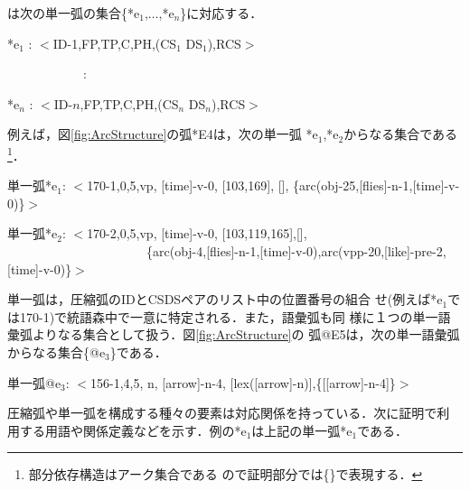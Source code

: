 {\mynoindent}は次の単一弧の集合\{*e$_1$,${\ldots}$,*e$_n$\}に対応する．

\mygapskip
*e$_1$ : $<$ID-1,FP,TP,C,PH,(CS$_1$ DS$_1$),RCS$>$

　　　　　　:

*e$_n$ : $<$ID-$n$,FP,TP,C,PH,(CS$_n$ DS$_n$),RCS$>$
\mygapskip

{\mynoindent}例えば，図\ref{fig:ArcStructure}の弧*E4は，次の単一弧
*e$_1$,*e$_2$からなる集合である\footnote{部分依存構造はアーク集合である
ので証明部分では\{\}で表現する．}．

\mygapskip
単一弧*e$_1$: $<$170-1,0,5,vp, [time]-v-0, [103,169], [], \{arc(obj-25,[flies]-n-1,[time]-v-0)\}$>$

単一弧*e$_2$: $<$170-2,0,5,vp, [time]-v-0, [103,119,165],[],\\
　　　　　　　　　　　\{arc(obj-4,[flies]-n-1,[time]-v-0),arc(vpp-20,[like]-pre-2,[time]-v-0)\}$>$
\mygapskip

{\mynoindent}単一弧は，圧縮弧のIDとCSDSペアのリスト中の位置番号の組合
せ(例えば*e$_1$では170-1)で統語森中で一意に特定される．また，語彙弧も同
様に１つの単一語彙弧よりなる集合として扱う．図\ref{fig:ArcStructure}の
弧@E5は，次の単一語彙弧からなる集合\{@e$_3$\}である．

\mygapskip
単一弧@e$_3$: $<$156-1,4,5, n, [arrow]-n-4, [lex([arrow]-n)],\{[[arrow]-n-4]\}$>$
\mygapskip

圧縮弧や単一弧を構成する種々の要素は対応関係を持っている．次に証明で利
用する用語や関係定義などを示す．例の*e$_1$は上記の単一弧*e$_1$である．

